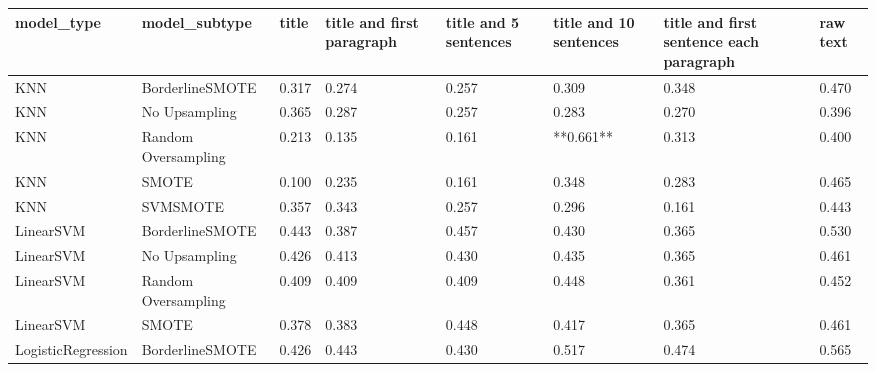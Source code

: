 \begin{tabular}{llllllll}
\toprule
                  model\_type &       model\_subtype & title & title and first paragraph & title and 5 sentences & title and 10 sentences & title and first sentence each paragraph & raw text \\
\midrule
                         KNN &     BorderlineSMOTE & 0.317 &                     0.274 &                 0.257 &                  0.309 &                                   0.348 &    0.470 \\
                         KNN &       No Upsampling & 0.365 &                     0.287 &                 0.257 &                  0.283 &                                   0.270 &    0.396 \\
                         KNN & Random Oversampling & 0.213 &                     0.135 &                 0.161 &              **0.661** &                                   0.313 &    0.400 \\
                         KNN &               SMOTE & 0.100 &                     0.235 &                 0.161 &                  0.348 &                                   0.283 &    0.465 \\
                         KNN &            SVMSMOTE & 0.357 &                     0.343 &                 0.257 &                  0.296 &                                   0.161 &    0.443 \\
                   LinearSVM &     BorderlineSMOTE & 0.443 &                     0.387 &                 0.457 &                  0.430 &                                   0.365 &    0.530 \\
                   LinearSVM &       No Upsampling & 0.426 &                     0.413 &                 0.430 &                  0.435 &                                   0.365 &    0.461 \\
                   LinearSVM & Random Oversampling & 0.409 &                     0.409 &                 0.409 &                  0.448 &                                   0.361 &    0.452 \\
                   LinearSVM &               SMOTE & 0.378 &                     0.383 &                 0.448 &                  0.417 &                                   0.365 &    0.461 \\
          LogisticRegression &     BorderlineSMOTE & 0.426 &                     0.443 &                 0.430 &                  0.517 &                                   0.474 &    0.565 \\

\end{tabular}

